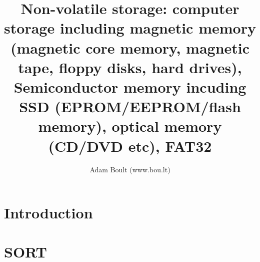 \documentclass[oneside]{book}
\begin{document}
\author{Adam Boult (www.bou.lt)}
\title{Non-volatile storage: computer storage including magnetic memory (magnetic core memory, magnetic tape, floppy disks, hard drives), Semiconductor memory incuding SSD (EPROM/EEPROM/flash memory), optical memory (CD/DVD etc), FAT32}
\maketitle

\setcounter{tocdepth}{0}
\tableofcontents



\part{Introduction}





\part{SORT}

\end{document}
